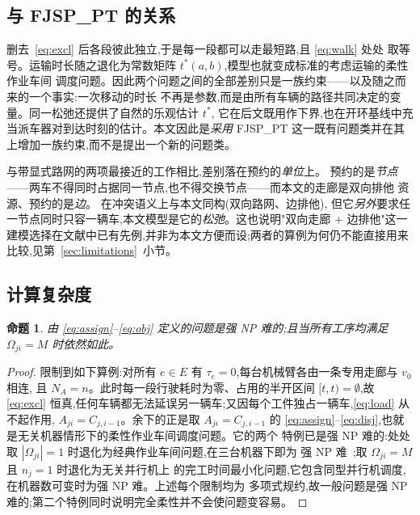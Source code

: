 \documentclass[manuscript,screen,review]{acmart}
\newtheorem{prop}{命题}
\begin{document}
\subsection{与 FJSP\_PT 的关系}
\label{sec:fjsppt}

删去~\eqref{eq:excl} 后各段彼此独立,于是每一段都可以走最短路,且 \eqref{eq:walk} 处处
取等号。运输时长随之退化为常数矩阵 $t^{*}(a,b)$,模型也就变成标准的考虑运输的柔性作业车间
调度问题。因此两个问题之间的全部差别只是一族约束——以及随之而来的一个事实:一次移动的时长
不再是参数,而是由所有车辆的路径共同决定的变量。同一松弛还提供了自然的乐观估计 $t^{*}$,
它在后文既用作下界,也在开环基线中充当派车器对到达时刻的估计。本文因此是\emph{采用}
FJSP\_PT 这一既有问题类并在其上增加一族约束,而不是提出一个新的问题类。

与带显式路网的两项最接近的工作相比,差别落在预约的\emph{单位}上。\cite{vanos2026exact}
预约的是\emph{节点}——两车不得同时占据同一节点,也不得交换节点——而本文的走廊是双向排他
资源、预约的是\emph{边}。\cite{lyu2019approach} 在冲突语义上与本文同构(双向路网、边排他),
但它\emph{另外}要求任一节点同时只容一辆车,本文模型是它的\emph{松弛}。这也说明"双向走廊
$+$ 边排他"这一建模选择在文献中已有先例,并非为本文方便而设;两者的算例为何仍不能直接用来
比较,见第~\ref{sec:limitations}~小节。

\subsection{计算复杂度}

\begin{prop}
\label{prop:np_hard}
由 \eqref{eq:assign}--\eqref{eq:obj} 定义的问题是强 NP 难的;且当所有工序均满足
$\Omega_{ji}=M$ 时依然如此。
\end{prop}

\begin{proof}
限制到如下算例:对所有 $e\in E$ 有 $\tau_e=0$,每台机械臂各由一条专用走廊与 $v_0$ 相连,
且 $N_A=n$。此时每一段行驶耗时为零、占用的半开区间 $[t,t)=\emptyset$,故 \eqref{eq:excl}
恒真,任何车辆都无法延误另一辆车;又因每个工件独占一辆车,\eqref{eq:load} 从不起作用,
$A_{ji}=C_{j,i-1}$。余下的正是取 $A_{ji}=C_{j,i-1}$ 的
\eqref{eq:assign}--\eqref{eq:disj},也就是无关机器情形下的柔性作业车间调度问题。它的两个
特例已是强 NP 难的:处处取 $|\Omega_{ji}|=1$ 时退化为经典作业车间问题,在三台机器下即为
强 NP 难~\cite{garey1976complexity};取 $\Omega_{ji}=M$ 且 $n_j=1$ 时退化为无关并行机上
的完工时间最小化问题,它包含同型并行机调度,在机器数可变时为强 NP 难。上述每个限制均为
多项式规约,故一般问题是强 NP 难的;第二个特例同时说明完全柔性并不会使问题变容易。
\end{proof}
\end{document}
